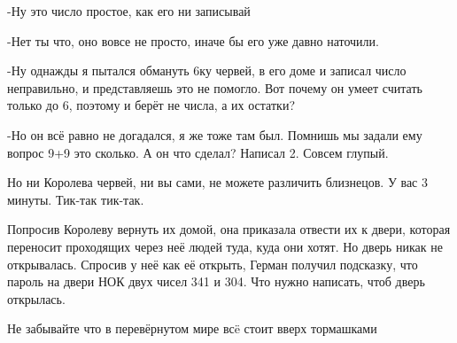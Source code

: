 -Ну это число простое, как его ни записывай

-Нет ты что, оно вовсе не просто, иначе бы его уже давно наточили.

-Ну однажды я пытался обмануть 6ку червей, в его доме и записал число неправильно, и представляешь это не помогло. Вот почему он умеет считать только до 6, поэтому и берёт не числа, а их остатки?

-Но он всё равно не догадался, я же тоже там был. Помнишь мы задали ему вопрос 9+9 это сколько. А он что сделал? Написал 2. Совсем глупый.

Но ни Королева червей, ни вы сами, не можете различить близнецов. У вас 3 минуты. Тик-так тик-так.  


Попросив Королеву вернуть их домой, она приказала отвести их к двери, которая переносит проходящих через неё людей туда, куда они хотят. Но дверь никак не открывалась. Спросив у неё как её открыть, Герман получил подсказку, что пароль на двери НОК двух чисел 341 и 304. Что нужно написать, чтоб дверь открылась. 

Не забывайте что в перевёрнутом мире всë стоит вверх тормашками

